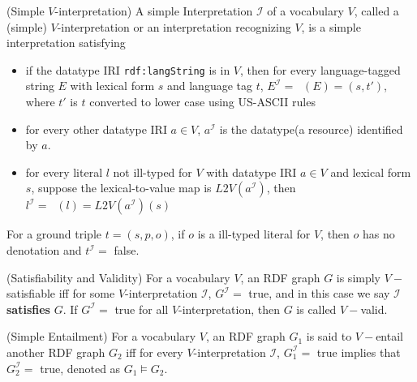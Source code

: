 \documentclass{article}
\DeclareMathOperator{\IL}{I_{L}}
\begin{document}
\begin{defin}(Simple $V$-interpretation)
A simple Interpretation $\mathcal{I}$ of a vocabulary $V$, called a (simple) $V$-interpretation or an interpretation recognizing $V$, is a simple interpretation satisfying 
\begin{itemize}
\item if the datatype IRI \texttt{rdf:langString} is in $V$, then for every language-tagged string $E$ with lexical form $s$ and language tag $t$, $E^{\mathcal{I}} = \IL(E) = (s,t')$, where $t'$ is $t$ converted to lower case using US-ASCII rules 
\item for every other datatype IRI $a\in V$, $a^{\mathcal{I}}$ is the datatype(a resource) identified by $a$. 
\item for every literal $l$ not ill-typed for $V$ with datatype IRI $a \in V$ and lexical form $s$, suppose the lexical-to-value map is $L2V(a^{\mathcal{I}})$, then $l^{\mathcal{I}} = \IL(l) = L2V(a^{\mathcal{I}})(s)$
\end{itemize}
\end{defin}
\noindent For a ground triple $t = (s,p,o)$, if $o$ is a ill-typed literal for $V$, then $o$ has no denotation and $t^{\mathcal{I}} = $ false. 

\begin{defin}(Satisfiability and Validity)\newline
For a vocabulary $V$, an RDF graph $G$ is  simply $V-$satisfiable iff for some $V$-interpretation $\mathcal{I}$, $G^{\mathcal{I}} = $ true, and in this case we say $\mathcal{I}$ \textbf{satisfies} $G$. If $G^{\mathcal{I}} = $ true for all $V$-interpretation, then $G$ is called $V-$valid. 
\end{defin}

\begin{defin}(Simple Entailment)\newline
For a vocabulary $V$, an RDF graph $G_1$ is said to $V-$entail another RDF graph $G_2$ iff for every $V$-interpretation $\mathcal{I}$, $G_1^{\mathcal{I}} = $ true implies that $G_2^{\mathcal{I}} = $ true, denoted as $G_1 \vDash G_2$.
\end{defin}
\end{document}
